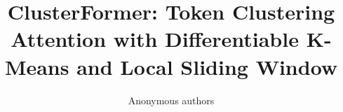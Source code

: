 \title{\textbf{ClusterFormer: Token Clustering Attention with Differentiable K-Means and Local Sliding Window}}

\author{Anonymous authors}
